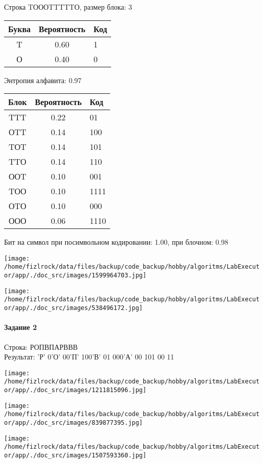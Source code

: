 \documentclass[a4paper, 12pt]{article}
\begin{document}
Строка TОООTTTTTО, размер блока: 3
\begin{center}
 \begin{tabular}{ |c|c|l| } 
  \hline
     Буква & Вероятность & Код\\ \hline
T & 0.60 & 1\\\hline
О & 0.40 & 0
\\ \hline \end{tabular}
\end{center}
Энтропия алфавита: 0.97
\begin{center}
 \begin{tabular}{ |c|c|l| } 
  \hline
     Блок & Вероятность & Код\\ \hline
TTT & 0.22 & 01\\\hline
ОTT & 0.14 & 100\\\hline
TОT & 0.14 & 101\\\hline
TTО & 0.14 & 110\\\hline
ООT & 0.10 & 001\\\hline
TОО & 0.10 & 1111\\\hline
ОTО & 0.10 & 000\\\hline
ООО & 0.06 & 1110
\\ \hline \end{tabular}
\end{center}
Бит на символ при посимвольном кодировании: 1.00, при блочном: 0.98

\texttt{[image: /home/fizlrock/data/files/backup/code\_backup/hobby/algoritms/LabExecutor/app/./doc\_src/images/1599964703.jpg]}

\texttt{[image: /home/fizlrock/data/files/backup/code\_backup/hobby/algoritms/LabExecutor/app/./doc\_src/images/538496172.jpg]}
\pagebreak
\paragraph{Задание 2}

Строка: 
РОПВПАРВВВ\\
Результат: 'Р' 0'О' 00'П' 100'В' 01 000'А' 00 101 00 11

\texttt{[image: /home/fizlrock/data/files/backup/code\_backup/hobby/algoritms/LabExecutor/app/./doc\_src/images/1211815096.jpg]}

\texttt{[image: /home/fizlrock/data/files/backup/code\_backup/hobby/algoritms/LabExecutor/app/./doc\_src/images/839877395.jpg]}

\texttt{[image: /home/fizlrock/data/files/backup/code\_backup/hobby/algoritms/LabExecutor/app/./doc\_src/images/1507593360.jpg]}
\end{document}
